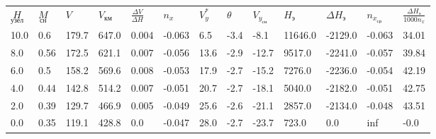 \begin{tabular}{lllllllllllll}
$\underset{узел}{H}$ & $\underset{сн}{M}$ & $V$ & $V_{км}$ & $\frac{\Delta V}{\Delta H}$ & $n_x$ & $V_{y}^*$ & $\theta$ & $V_{y_{сн}}$ & $H_э$ & $\Delta H_э$ & $n_{x_{ср}}$ & $\frac{\Delta H_{э}}{1000 n_x}$ \\
10.0 & 0.6 & 179.7 & 647.0 & 0.004 & -0.063 & 6.5 & -3.4 & -8.1 & 11646.0 & -2129.0 & -0.063 & 34.01 \\
8.0 & 0.56 & 172.5 & 621.1 & 0.007 & -0.056 & 13.6 & -2.9 & -12.7 & 9517.0 & -2241.0 & -0.057 & 39.84 \\
6.0 & 0.5 & 158.2 & 569.6 & 0.008 & -0.053 & 17.9 & -2.7 & -15.2 & 7276.0 & -2236.0 & -0.054 & 42.19 \\
4.0 & 0.44 & 142.8 & 514.2 & 0.007 & -0.051 & 20.7 & -2.7 & -18.1 & 5040.0 & -2182.0 & -0.051 & 42.75 \\
2.0 & 0.39 & 129.7 & 466.9 & 0.005 & -0.049 & 25.6 & -2.6 & -21.1 & 2857.0 & -2134.0 & -0.048 & 43.51 \\
0.0 & 0.35 & 119.1 & 428.8 & 0.0 & -0.047 & 28.0 & -2.7 & -23.7 & 723.0 & 0.0 & inf & -0.0 \\
\end{tabular}
